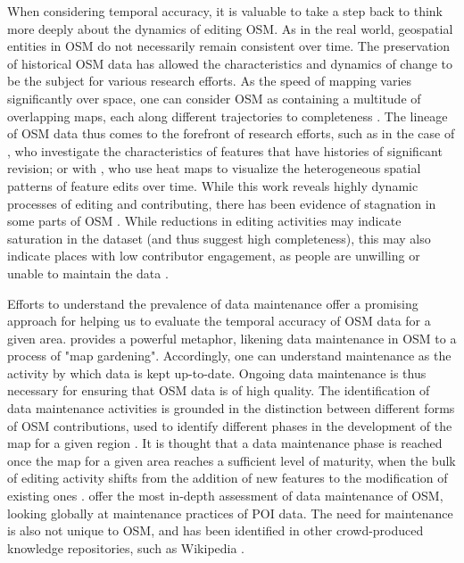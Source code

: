 When considering temporal accuracy, it is valuable to take a step back to think more deeply about the dynamics of editing OSM. As in the real world, geospatial entities in OSM do not necessarily remain consistent over time. The preservation of historical OSM data has allowed the characteristics and dynamics of change to be the subject for various research efforts. As the speed of mapping varies significantly over space, one can consider OSM as containing a multitude of overlapping maps, each along different trajectories to completeness \parencite{chuang_one_2013}. The lineage of OSM data thus comes to the forefront of research efforts, such as in the case of \textcite{mooney_characteristics_2012}, who investigate the characteristics of features that have histories of significant revision; or with  \textcite{trame_exploring_2011}, who use heat maps to visualize the heterogeneous spatial patterns of feature edits over time. While this work reveals highly dynamic processes of editing and contributing, there has been evidence of stagnation in some parts of OSM \parencite{grochenig_digging_2014}. While reductions in editing activities may indicate saturation in the dataset (and thus suggest high completeness), this may also indicate places with low contributor engagement, as people are unwilling or unable to maintain the data \parencite{grochenig_digging_2014}.

Efforts to understand the prevalence of data maintenance offer a promising approach for helping us to evaluate the temporal accuracy of OSM data for a given area. \textcite{mcconchie_wiki_2013} provides a powerful metaphor, likening data maintenance in OSM to a process of "map gardening". Accordingly, one can understand maintenance as the activity by which data is kept up-to-date. Ongoing data maintenance is thus necessary for ensuring that OSM data is of high quality. The identification of data maintenance activities is grounded in the distinction between different forms of OSM contributions, used to identify different phases in the development of the map for a given region \parencite{anderson_crowd_2018}. It is thought that a data maintenance phase is reached once the map for a given area reaches a sufficient level of maturity, when the bulk of editing activity shifts from the addition of new features to the modification of existing ones \parencite{anderson_crowd_2018}. \textcite{quattrone_work_2017} offer the most in-depth assessment of data maintenance of OSM, looking globally at maintenance practices of POI data. The need for maintenance is also not unique to OSM, and has been identified in other crowd-produced knowledge repositories, such as Wikipedia \parencite{kittur_he_2007}. 

